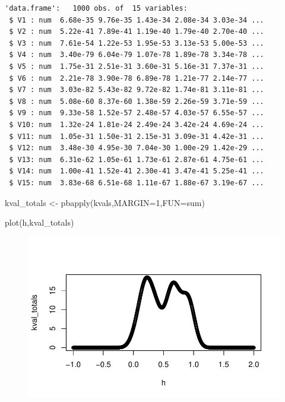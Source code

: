 \documentclass[
  letterpaper,
  DIV=11,
  numbers=noendperiod]{scrartcl}
\newenvironment{Shaded}{\begin{snugshade}}{\end{snugshade}}
\newcommand{\AttributeTok}[1]{\textcolor[rgb]{0.40,0.45,0.13}{#1}}
\newcommand{\DecValTok}[1]{\textcolor[rgb]{0.68,0.00,0.00}{#1}}
\newcommand{\FunctionTok}[1]{\textcolor[rgb]{0.28,0.35,0.67}{#1}}
\newcommand{\NormalTok}[1]{\textcolor[rgb]{0.00,0.23,0.31}{#1}}
\newcommand{\OtherTok}[1]{\textcolor[rgb]{0.00,0.23,0.31}{#1}}
\newcommand{\StringTok}[1]{\textcolor[rgb]{0.13,0.47,0.30}{#1}}
\begin{document}
\begin{verbatim}
'data.frame':   1000 obs. of  15 variables:
 $ V1 : num  6.68e-35 9.76e-35 1.43e-34 2.08e-34 3.03e-34 ...
 $ V2 : num  5.22e-41 7.89e-41 1.19e-40 1.79e-40 2.70e-40 ...
 $ V3 : num  7.61e-54 1.22e-53 1.95e-53 3.13e-53 5.00e-53 ...
 $ V4 : num  3.40e-79 6.04e-79 1.07e-78 1.89e-78 3.34e-78 ...
 $ V5 : num  1.75e-31 2.51e-31 3.60e-31 5.16e-31 7.37e-31 ...
 $ V6 : num  2.21e-78 3.90e-78 6.89e-78 1.21e-77 2.14e-77 ...
 $ V7 : num  3.03e-82 5.43e-82 9.72e-82 1.74e-81 3.11e-81 ...
 $ V8 : num  5.08e-60 8.37e-60 1.38e-59 2.26e-59 3.71e-59 ...
 $ V9 : num  9.33e-58 1.52e-57 2.48e-57 4.03e-57 6.55e-57 ...
 $ V10: num  1.32e-24 1.81e-24 2.49e-24 3.42e-24 4.69e-24 ...
 $ V11: num  1.05e-31 1.50e-31 2.15e-31 3.09e-31 4.42e-31 ...
 $ V12: num  3.48e-30 4.95e-30 7.04e-30 1.00e-29 1.42e-29 ...
 $ V13: num  6.31e-62 1.05e-61 1.73e-61 2.87e-61 4.75e-61 ...
 $ V14: num  1.00e-41 1.52e-41 2.30e-41 3.47e-41 5.25e-41 ...
 $ V15: num  3.83e-68 6.51e-68 1.11e-67 1.88e-67 3.19e-67 ...
\end{verbatim}

\begin{Shaded}
\begin{Highlighting}[]
\NormalTok{kval\_totals }\OtherTok{\textless{}{-}} \FunctionTok{pbapply}\NormalTok{(kvals,}\AttributeTok{MARGIN=}\DecValTok{1}\NormalTok{,}\AttributeTok{FUN=}\StringTok{\textquotesingle{}sum\textquotesingle{}}\NormalTok{)}

\FunctionTok{plot}\NormalTok{(h,kval\_totals)}
\end{Highlighting}
\end{Shaded}

\begin{figure}[H]

{\centering \includegraphics{robby_homework_2_files/figure-pdf/unnamed-chunk-10-1.pdf}

}

\end{figure}
\end{document}
